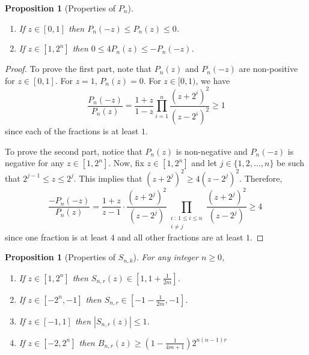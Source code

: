 \documentclass[12pt]{article}
\newtheorem{proposition}[definition]{Proposition}
\begin{document}
\begin{proposition}[Properties of $P_n$]
\label{proposition:properties-of-p-n}
\hspace{1cm} %
\begin{enumerate}
\item If $z \in [0,1]$ then $P_n(-z) \le P_n(z) \le 0$.
\item If $z \in [1,2^n]$ then $0 \le 4P_n(z) \le -P_n(-z)$.
\end{enumerate}
\end{proposition}

\begin{proof}
To prove the first part, note that $P_n(z)$ and $P_n(-z)$ are non-positive for
$z \in [0,1]$. For $z=1$, $P_n(z) = 0$. For $z \in [0,1)$, we have
$$
\frac{P_n(-z)}{P_n(z)} = \frac{1+z}{1-z} \prod_{i=1}^n \frac{(z+2^i)^2}{(z-2^i)^2} \ge 1
$$
since each of the fractions is at least $1$.

To prove the second part, notice that $P_n(z)$ is non-negative and $P_n(-z)$ is
negative for any $z \in [1,2^n]$. Now, fix $z \in [1,2^n]$ and let $j \in
\{1,2,\dots,n\}$ be such that $2^{j-1} \le z \le 2^j$. This implies that
$(z+2^{j})^2 \ge 4 (z - 2^j)^2$. Therefore,
$$
\frac{-P_n(-z)}{P_n(z)}
= \frac{1+z}{z-1} \cdot \frac{(z+2^j)^2}{(z-2^j)} \prod_{\substack{i ~:~ 1 \le i \le n \\ i \neq j}} \frac{(z+2^j)^2}{(z-2^j)}
\ge 4 \;
$$
since one fraction is at least $4$ and all other fractions are at least $1$.
\end{proof}

\begin{proposition}[Properties of $S_{n,k}$]
For any integer $n \ge 0$,
\begin{enumerate}
\item If $z \in [1,2^n]$ then $S_{n,r}(z) \in [1,1+\frac{1}{2m}]$.
\item If $z \in [-2^n, -1]$ then $S_{n,r} \in [-1-\frac{1}{2m}, -1]$.
\item If $z \in [-1,1]$ then $|S_{n,r}(z)| \le 1$.
\item If $z \in [-2,2^n]$ then $B_{n,r}(z) \ge \left(1 - \frac{1}{4m+1} \right) 2^{n(n-1)r}$
\end{enumerate}
\end{proposition}
\end{document}

